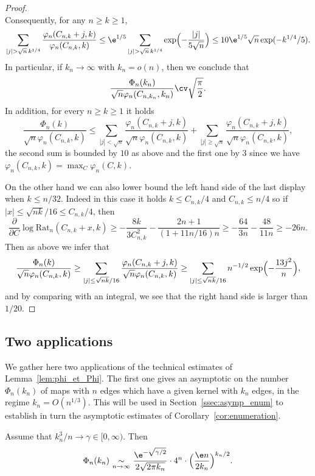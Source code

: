 \begin{proof}
\[\]
Consequently, for any $n\ge k \ge 1$,
\[
\sum_{|j| > \sqrt{n}\,k^{1/4}} \frac{\varphi_{n}(C_{n,k}+j,k)}{\varphi_{n}(C_{n,k},k)}
\leq \e^{1/5} \sum_{|j| > \sqrt{n}\,k^{1/4}} \exp\Bigl(- \frac{|j|}{5\sqrt{n}}\Bigr)
\leq 10 \e^{1/5} \sqrt{n} \exp(- k^{1/4}/5).
\]
In particular, if $k_n \to\infty$ with $k_n = o(n)$, then we conclude that
\[
\frac{\Phi_n(k_n)}{\sqrt{n} \varphi_{n}(C_{n,k_n},k_n)} \cv \sqrt{\frac{\pi}{2}}.
\]
In addition, for every $n \ge k \ge 1$ it holds
\[
\frac{\Phi_n(k)}{\sqrt{n} \varphi_{n}(C_{n,k},k)}
\le \sum_{|j| < \sqrt{n}} \frac{\varphi_{n}(C_{n,k}+j,k)}{\sqrt{n} \varphi_{n}(C_{n,k},k)} + \sum_{|j| \ge \sqrt{n}} \frac{\varphi_{n}(C_{n,k}+j,k)}{\sqrt{n} \varphi_{n}(C_{n,k},k)},
\]
the second sum is bounded by $10$ as above and the first one by $3$ since we have $\varphi_{n}(C_{n,k},k) = \max_C \varphi_{n}(C,k)$.

On the other hand we can also lower bound the left hand side of the last display when $k \le n/32$. Indeed in this case it holds $k \le C_{n,k}/4$ and $C_{n,k} \le n/4$ so if $|x| \le \sqrt{nk}/16 \le C_{n,k}/4$, then\vspace*{-3pt}
\[
\frac{\partial}{\partial C} \log \mathrm{Rat}_n(C_{n,k}+x,k)
\ge - \frac{8k}{3 C_{n,k}^2} - \frac{2n+1}{(1+11n/16) n}
\ge - \frac{64}{3 n} - \frac{48}{11n}
\ge -26n.
\]
Then as above we infer that
\[
\frac{\Phi_n(k)}{\sqrt{n} \varphi_{n}(C_{n,k},k)}
\ge \sum_{|j| \leq \sqrt{nk}/16} \frac{\varphi_{n}(C_{n,k}+j,k)}{\sqrt{n} \varphi_{n}(C_{n,k},k)}
\ge \sum_{|j| \leq \sqrt{nk}/16} n^{-1/2} \exp\Bigl(-\frac{13 j^2}{n}\Bigr),
\]
and by comparing with an integral, we see that the right hand side is larger than \eg $1/20$.
\end{proof}

\subsection{Two applications}

We gather here two applications of the technical estimates of Lemma~\ref{lem:phi_et_Phi}. The first one gives an asymptotic on the number $\Phi_{n}(k_{n})$ of maps with $n$ edges which have a given kernel with $k_{n}$ edges, in the regime $k_n = O(n^{1/3})$. This will be used in Section~\ref{ssec:asymp_enum} to establish in turn the asymptotic estimates of Corollary~\ref{cor:enumeration}.

\begin{corollary}
\label{cor:equivPhikn}
Assume that $k_{n}^3/n \to \gamma \in [0,\infty)$. Then\vspace*{-3pt}
\[
\Phi_{n}(k_{n}) \, \mathop{\sim}_{n \rightarrow \infty} \,
\frac{\e^{- \sqrt{\gamma/2}}}{2\sqrt{2 \pi k_{n}}} \cdot 4^{n} \cdot \Bigl(\frac{\e n}{2 k_{n}}\Bigr)^{k_{n}/2}.
\]
\end{corollary}

